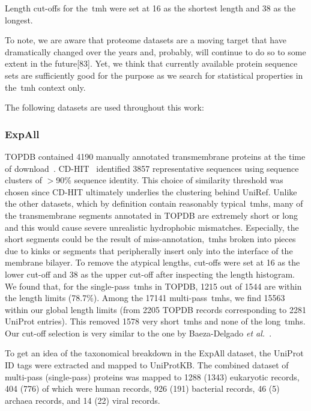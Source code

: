 Length cut-offs for the~\gls{tmh} were set at 16 as the shortest length and 38 as the longest.

To note, we are aware that proteome datasets are a moving target that have dramatically changed over the years and, probably, will continue to do so to some extent in the future[83].
Yet, we think that currently available protein sequence sets are sufficiently good for the purpose as we search for statistical properties in the~\gls{tmh} context only.

The following datasets are used throughout this work:

\subsubsection{ExpAll}

TOPDB contained 4190 manually annotated transmembrane proteins at the time of download~\cite{Dobson2015}.
CD-HIT~\cite{Huang2010} identified 3857 representative sequences using sequence clusters of $>$90\% sequence identity.
This choice of similarity threshold was chosen since CD-HIT ultimately underlies the clustering behind UniRef.
Unlike the other datasets, which by definition contain reasonably typical~\gls{tmh}s, many of the transmembrane segments annotated in TOPDB are extremely short or long and this would cause severe unrealistic hydrophobic mismatches.
Especially, the short segments could be the result of miss-annotation,~\gls{tmh}s broken into pieces due to kinks or segments that peripherally insert only into the interface of the membrane bilayer.
To remove the atypical lengths, cut-offs were set at 16 as the lower cut-off and 38 as the upper cut-off after inspecting the length histogram.
We found that, for the single-pass~\gls{tmh}s in TOPDB, 1215 out of 1544 are within the length limits (78.7\%).
Among the 17141 multi-pass~\gls{tmh}s, we find 15563 within our global length limits (from 2205 TOPDB records corresponding to 2281 UniProt entries).
This removed 1578 very short~\gls{tmh}s and none of the long~\gls{tmh}s.
Our cut-off selection is very similar to the one by Baeza-Delgado \textit{et al.}~\cite{Baeza-Delgado2013}.

To get an idea of the taxonomical breakdown in the ExpAll dataset, the UniProt ID tags were extracted and mapped to UniProtKB.
The combined dataset of multi-pass (single-pass) proteins was mapped to 1288 (1343) eukaryotic records, 404 (776) of which were human records, 926 (191) bacterial records, 46 (5) archaea records, and 14 (22) viral records.


